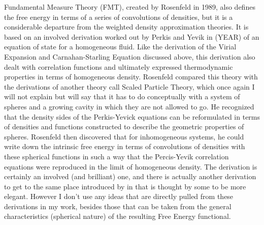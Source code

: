 Fundamental Measure Theory (FMT), created by Rosenfeld in 1989, also
defines the free energy in terms of a series of convolutions of
densities, but it is a considerable departure from the weighted
density approximation theories.  It is based on an involved derivation
worked out by Perkis and Yevik in (YEAR) of an equation of state for a
homogeneous fluid.  Like the derivation of the Virial Expansion and
Carnahan-Starling Equation discussed above, this derivation also dealt
with correlation functions and ultimately expressed thermodynamic
properties in terms of homogeneous density.  Rosenfeld compared this
theory with the derivations of another theory call Scaled Particle
Theory, which once again I will not explain but will say that it has
to do conceptually with a system of spheres and a growing cavity in
which they are not allowed to go.  He recognized that the density
sides of the Perkis-Yevick equations can be reformulated in terms of
densities and functions constructed to describe the geometric
properties of spheres.  Rosenfeld then discovered that for
inhomogeneous systems, he could write down the intrinsic free energy
in terms of convolutions of densities with these spherical functions
in such a way that the Percis-Yevik correlation equations were
reproduced in the limit of homogeneous density.  The derivation is
certainly an involved (and brilliant) one, and there is actually
another derivation to get to the same place introduced by 
in  that is thought by some to be more elegant.  However I don't
use any ideas that are directly pulled from these derivations in my
work, besides those that can be taken from the general characteristics
(spherical nature) of the resulting Free Energy functional.

